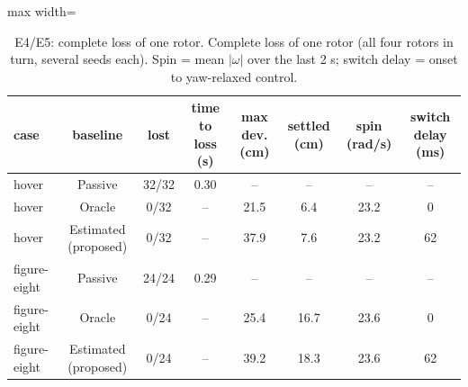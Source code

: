 \begin{table}[t]
\centering
\caption{E4/E5: complete loss of one rotor. Complete loss of one rotor (all four rotors in turn, several seeds each). Spin = mean $|\omega|$ over the last 2 s; switch delay = onset to yaw-relaxed control.}
\label{tab:e4}
\footnotesize
\setlength{\tabcolsep}{3pt}
\begin{adjustbox}{max width=\linewidth}
\begin{tabular}{lccccccc}
\toprule
case & baseline & lost & time to loss (s) & max dev. (cm) & settled (cm) & spin (rad/s) & switch delay (ms) \\
\midrule
hover & Passive & 32/32 & 0.30 & -- & -- & -- & -- \\
hover & Oracle & 0/32 & -- & 21.5 & 6.4 & 23.2 & 0 \\
hover & Estimated (proposed) & 0/32 & -- & 37.9 & 7.6 & 23.2 & 62 \\
figure-eight & Passive & 24/24 & 0.29 & -- & -- & -- & -- \\
figure-eight & Oracle & 0/24 & -- & 25.4 & 16.7 & 23.6 & 0 \\
figure-eight & Estimated (proposed) & 0/24 & -- & 39.2 & 18.3 & 23.6 & 62 \\
\bottomrule
\end{tabular}
\end{adjustbox}
\end{table}
